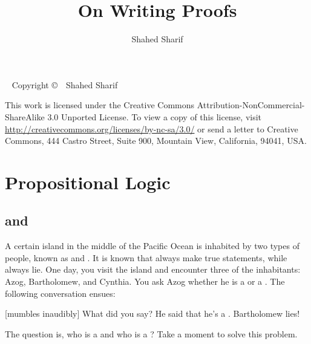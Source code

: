 \documentclass{tufte-book}
\title{On Writing Proofs}
\author{Shahed Sharif}
\begin{document}
\maketitle

\newpage
\begin{fullwidth}
~\vfill
\thispagestyle{empty}
\setlength{\parindent}{0pt}
\setlength{\parskip}{\baselineskip}
Copyright \copyright\ \the\year\ Shahed Sharif

\par \cc \byncsa 

This work is licensed under the Creative Commons Attribution-NonCommercial-ShareAlike 3.0 Unported License. To view a copy of this license, visit \url{http://creativecommons.org/licenses/by-nc-sa/3.0/} or send a letter to Creative Commons, 444 Castro Street, Suite 900, Mountain View, California, 94041, USA.

\end{fullwidth}

\tableofcontents

\chapter{Propositional Logic}
\label{cha:propositional-logic}

\section{\Knights and \knaves}
\label{sec:knights-knaves}

A certain island in the middle of the Pacific Ocean is inhabited by two types of people, known as \knights and \knaves. It is known that \knights always make true statements, while \knaves always lie. One day, you visit the island and encounter three of the inhabitants: Azog, Bartholomew, and Cynthia. You ask Azog whether he is a \knight or a \knave. The following conversation ensues:

\begin{example}\label{ex:knight-knave-1}
  \begin{dialogue}
     [mumbles inaudibly]
     What did you say?
     He said that he's a \knave. 
     Bartholomew lies!
  \end{dialogue}
\end{example}

The question is, who is a \knight and who is a \knave? Take a moment to solve this problem.
\end{document}
